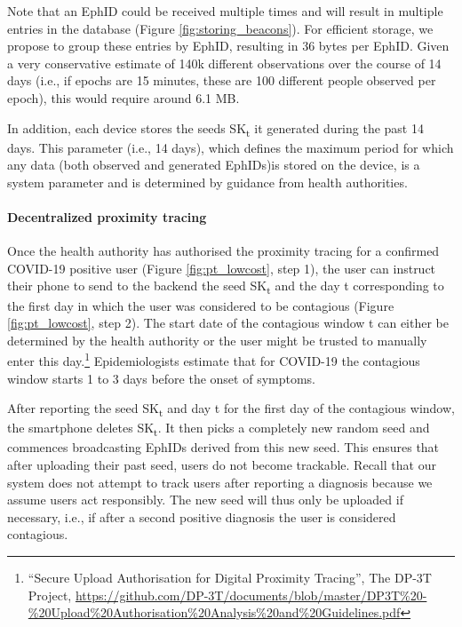 \documentclass{article}
\begin{document}
Note that an EphID could be received multiple times and will result in
multiple entries in the database (Figure \ref{fig:storing_beacons}). For efficient storage, we
propose to group these entries by EphID, resulting in 36 bytes per
EphID. Given a very conservative estimate of 140k different observations
over the course of 14 days (i.e., if epochs are 15 minutes, these are
100 different people observed per epoch), this would require around 6.1
MB.

In addition, each device stores the seeds SK\textsubscript{t} it
generated during the past 14 days. This parameter (i.e., 14 days), which
defines the maximum period for which any data (both observed and
generated EphIDs)is stored on the device, is a system parameter and is
determined by guidance from health authorities.

\hypertarget{decentralized-proximity-tracing-1}{%
\paragraph{Decentralized proximity
tracing}\label{decentralized-proximity-tracing-1}}

Once the health authority has authorised the proximity tracing for a
confirmed COVID-19 positive user (Figure \ref{fig:pt_lowcost}, step 1), the user can
instruct their phone to send to the backend the seed SK\textsubscript{t}
and the day t corresponding to the first day in which the user was
considered to be contagious (Figure \ref{fig:pt_lowcost}, step 2). The start date of the
contagious window t can either be determined by the health authority or
the user might be trusted to manually enter this day.\footnote{``Secure
  Upload Authorisation for Digital Proximity Tracing'', The DP-3T
  Project,
  \href{https://github.com/DP-3T/documents/blob/master/DP3T\%20-\%20Upload\%20Authorisation\%20Analysis\%20and\%20Guidelines.pdf}{{https://github.com/DP-3T/documents/blob/master/DP3T\%20-\%20Upload\%20Authorisation\%20Analysis\%20and\%20Guidelines.pdf}}}
Epidemiologists estimate that for COVID-19 the contagious window starts
1 to 3 days before the onset of symptoms.

After reporting the seed SK\textsubscript{t} and day t for the first day
of the contagious window, the smartphone deletes SK\textsubscript{t}. It
then picks a completely new random seed and commences broadcasting
EphIDs derived from this new seed. This ensures that after uploading
their past seed, users do not become trackable. Recall that our system
does not attempt to track users after reporting a diagnosis because we
assume users act responsibly. The new seed will thus only be uploaded if
necessary, i.e., if after a second positive diagnosis the user is
considered contagious.
\end{document}
